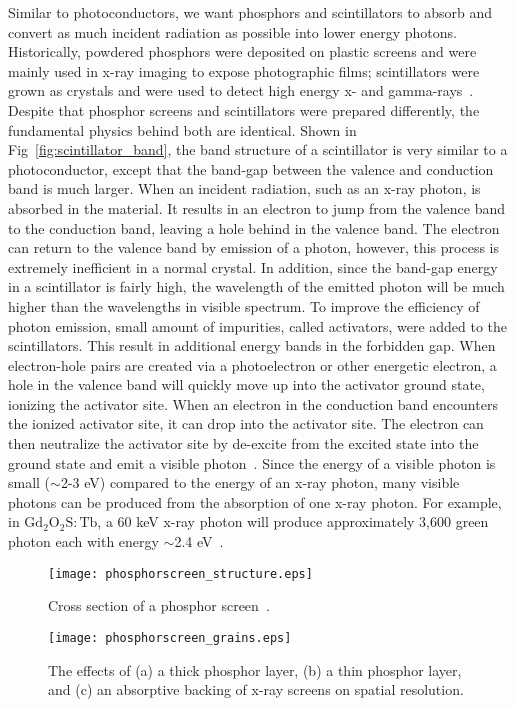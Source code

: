 Similar to photoconductors, we want phosphors and scintillators to absorb and convert as much incident radiation as possible into lower energy photons.  Historically, powdered phosphors were deposited on plastic screens and were mainly used in x-ray imaging to expose photographic films; scintillators were grown as crystals and were used to detect high energy x- and gamma-rays~\citep{Nikl2006}.  Despite that phosphor screens and scintillators were prepared differently, the fundamental physics behind both are identical.  Shown in Fig~\ref{fig:scintillator_band}, the band structure of a scintillator is very similar to a photoconductor, except that the band-gap between the valence and conduction band is much larger.  When an incident radiation, such as an x-ray photon, is absorbed in the material.  It results in an electron to jump from the valence band to the conduction band, leaving a hole behind in the valence band.  The electron can return to the valence band by emission of a photon, however, this process is extremely inefficient in a normal crystal.  In addition, since the band-gap energy in a scintillator is fairly high, the wavelength of the emitted photon will be much higher than the wavelengths in visible spectrum.  To improve the efficiency of photon emission, small amount of impurities, called activators, were added to the scintillators.  This result in additional energy bands in the forbidden gap.  When electron-hole pairs are created via a photoelectron or other energetic electron, a hole in the valence band will quickly move up into the activator ground state, ionizing the activator site.  When an electron in the conduction band encounters the ionized activator site, it can drop into the activator site.  The electron can then neutralize the activator site by de-excite from the excited state into the ground state and emit a visible photon~\citep{Knoll2010}.  Since the energy of a visible photon is small ($\sim$2-3 eV) compared to the energy of an x-ray photon, many visible photons can be produced from the absorption of one x-ray photon.  For example, in $\mathrm{Gd_2O_2S:Tb}$, a 60 keV x-ray photon will produce approximately 3,600 green photon each with energy $\sim$2.4 eV~\citep{Rowlands2000}.

\begin{figure}[h]
\texttt{[image: phosphorscreen\_structure.eps]}
\caption{Cross section of a phosphor screen~\citep{Barrett1981}.}
\label{fig:phosphor_cross_section}
\end{figure}

\begin{figure}[h]
\texttt{[image: phosphorscreen\_grains.eps]}
\caption{The effects of (a) a thick phosphor layer, (b) a thin phosphor layer, and (c) an absorptive backing of x-ray screens on spatial resolution.}
\label{fig:phosphor_effects}
\end{figure}

